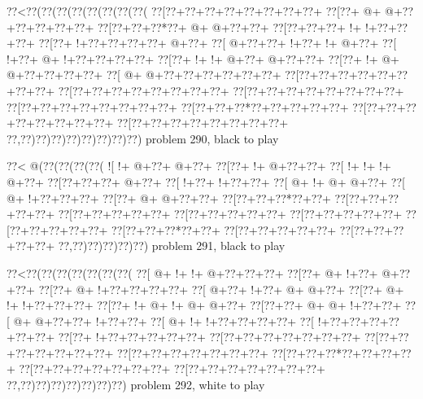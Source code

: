 \vbox{\vbox{\goo
\0??<\0??(\0??(\0??(\0??(\0??(\0??(\0??(\0??(
\0??[\0??+\0??+\0??+\0??+\0??+\0??+\0??+\0??+
\0??[\0??+\- @+\- @+\0??+\0??+\0??+\0??+\0??+
\0??[\0??+\0??+\0??*\0??+\- @+\- @+\0??+\0??+
\0??[\0??+\0??+\0??+\- !+\- !+\0??+\0??+\0??+
\0??[\0??+\- !+\0??+\0??+\0??+\0??+\- @+\0??+
\0??[\- @+\0??+\0??+\- !+\0??+\- !+\- @+\0??+
\0??[\- !+\0??+\- @+\- !+\0??+\0??+\0??+\0??+
\0??[\0??+\- !+\- !+\- @+\0??+\- @+\0??+\0??+
\0??[\0??+\- !+\- @+\- @+\0??+\0??+\0??+\0??+
\0??[\- @+\- @+\0??+\0??+\0??+\0??+\0??+\0??+
\0??[\0??+\0??+\0??+\0??+\0??+\0??+\0??+\0??+
\0??[\0??+\0??+\0??+\0??+\0??+\0??+\0??+\0??+
\0??[\0??+\0??+\0??+\0??+\0??+\0??+\0??+\0??+
\0??[\0??+\0??+\0??+\0??+\0??+\0??+\0??+\0??+
\0??[\0??+\0??+\0??*\0??+\0??+\0??+\0??+\0??+
\0??[\0??+\0??+\0??+\0??+\0??+\0??+\0??+\0??+
\0??[\0??+\0??+\0??+\0??+\0??+\0??+\0??+\0??+
\0??,\0??)\0??)\0??)\0??)\0??)\0??)\0??)\0??)
}
\hfil problem 290, black to play\hfil\break
}

\vbox{\vbox{\goo
\0??<\- @(\0??(\0??(\0??(\0??(
\- ![\- !+\- @+\0??+\- @+\0??+
\0??[\0??+\- !+\- @+\0??+\0??+
\0??[\- !+\- !+\- !+\- @+\0??+
\0??[\0??+\0??+\0??+\- @+\0??+
\0??[\- !+\0??+\- !+\0??+\0??+
\0??[\- @+\- !+\- @+\- @+\0??+
\0??[\- @+\- !+\0??+\0??+\0??+
\0??[\0??+\- @+\- @+\0??+\0??+
\0??[\0??+\0??+\0??*\0??+\0??+
\0??[\0??+\0??+\0??+\0??+\0??+
\0??[\0??+\0??+\0??+\0??+\0??+
\0??[\0??+\0??+\0??+\0??+\0??+
\0??[\0??+\0??+\0??+\0??+\0??+
\0??[\0??+\0??+\0??+\0??+\0??+
\0??[\0??+\0??+\0??*\0??+\0??+
\0??[\0??+\0??+\0??+\0??+\0??+
\0??[\0??+\0??+\0??+\0??+\0??+
\0??,\0??)\0??)\0??)\0??)\0??)
}
\hfil problem 291, black to play\hfil\break
}

\vbox{\vbox{\goo
\0??<\0??(\0??(\0??(\0??(\0??(\0??(\0??(
\0??[\- @+\- !+\- !+\- @+\0??+\0??+\0??+
\0??[\0??+\- @+\- !+\0??+\- @+\0??+\0??+
\0??[\0??+\- @+\- !+\0??+\0??+\0??+\0??+
\0??[\- @+\0??+\- !+\0??+\- @+\- @+\0??+
\0??[\0??+\- @+\- !+\- !+\0??+\0??+\0??+
\0??[\0??+\- !+\- @+\- !+\- @+\- @+\0??+
\0??[\0??+\0??+\- @+\- @+\- !+\0??+\0??+
\0??[\- @+\- @+\0??+\0??+\- !+\0??+\0??+
\0??[\- @+\- !+\- !+\0??+\0??+\0??+\0??+
\0??[\- !+\0??+\0??+\0??+\0??+\0??+\0??+
\0??[\0??+\- !+\0??+\0??+\0??+\0??+\0??+
\0??[\0??+\0??+\0??+\0??+\0??+\0??+\0??+
\0??[\0??+\0??+\0??+\0??+\0??+\0??+\0??+
\0??[\0??+\0??+\0??+\0??+\0??+\0??+\0??+
\0??[\0??+\0??+\0??*\0??+\0??+\0??+\0??+
\0??[\0??+\0??+\0??+\0??+\0??+\0??+\0??+
\0??[\0??+\0??+\0??+\0??+\0??+\0??+\0??+
\0??,\0??)\0??)\0??)\0??)\0??)\0??)\0??)
}
\hfil problem 292, white to play\hfil\break
}

